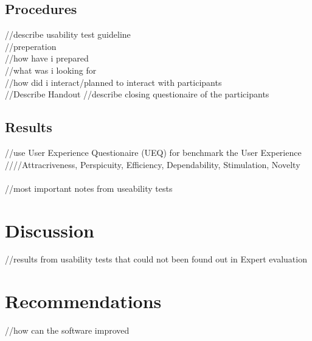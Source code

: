 \documentclass[]{article}
\begin{document}
\subsection{Procedures} \label{usability_tests_procedures}
//describe usability test guideline  \\
{//preperation \\
	//how have i prepared \\
	//what was i looking for\\
	//how did i interact/planned to interact with participants\\}
//Describe Handout
//describe closing questionaire of the participants

\subsection{Results}
//use User Experience Questionaire (UEQ) for benchmark the User Experience\\
////Attracriveness, Perspicuity, Efficiency, Dependability, Stimulation, Novelty\\\\
//most important notes from useability tests 


\section{Discussion}
//results from usability tests that could not been found out in Expert evaluation\\

\section{Recommendations}
//how can the software improved \\


\newpage



\end{document}
